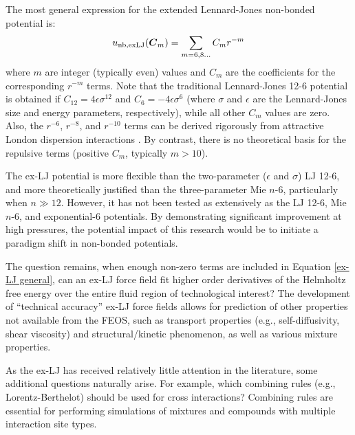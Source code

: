 \documentclass[11pt,a4paper]{article}
\newcommand{\bfv}[1]{{\mbox{\boldmath{$#1$}}}}
\newcommand{\C}{\bfv{C}}
\begin{document}
The most general expression for the extended Lennard-Jones non-bonded potential is:
\begin{equation} \label{ex-LJ general}
u_{\rm nb, exLJ}(\C_m) = \sum_{m = 6, 8 ...} C_m r^{-m} 
\end{equation} 
where $m$ are integer (typically even) values and $C_m$ are the coefficients for the corresponding $r^{-m}$ terms. Note that the traditional Lennard-Jones 12-6 potential is obtained if $C_{12} = 4\epsilon\sigma^{12}$ and $C_6=-4\epsilon\sigma^{6}$ (where $\sigma$ and $\epsilon$ are the Lennard-Jones size and energy parameters, respectively), while all other $C_m$ values are zero. Also, the $r^{-6}$, $r^{-8}$, and $r^{-10}$ terms can be derived rigorously from attractive London dispersion interactions \cite{Stone2013}. By contrast, there is no theoretical basis for the repulsive terms (positive $C_m$, typically $m > 10$).

The ex-LJ potential is more flexible than the two-parameter ($\epsilon$ and $\sigma$) LJ 12-6, and more theoretically justified than the three-parameter Mie $n$-6, particularly when $n \gg 12$. However, it has not been tested as extensively as the LJ 12-6, Mie $n$-6, and exponential-6 potentials. By demonstrating significant improvement at high pressures, the potential impact of this research would be to initiate a paradigm shift in non-bonded potentials.

The question remains, when enough non-zero terms are included in Equation \ref{ex-LJ general}, can an ex-LJ force field fit higher order derivatives of the Helmholtz free energy over the entire fluid region of technological interest? The development of ``technical accuracy'' ex-LJ force fields allows for prediction of other properties not available from the FEOS, such as transport properties (e.g., self-diffusivity, shear viscosity) and structural/kinetic phenomenon, as well as various mixture properties.


As the ex-LJ has received relatively little attention in the literature, some additional questions naturally arise. For example, which combining rules (e.g., Lorentz-Berthelot) should be used for cross interactions? Combining rules are essential for performing simulations of mixtures and compounds with multiple interaction site types. 
\end{document}

